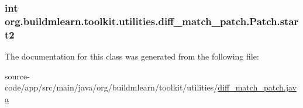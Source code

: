 \subsubsection[{\texorpdfstring{start2}{start2}}]{\setlength{\rightskip}{0pt plus 5cm}int org.\+buildmlearn.\+toolkit.\+utilities.\+diff\+\_\+match\+\_\+patch.\+Patch.\+start2}\hypertarget{classorg_1_1buildmlearn_1_1toolkit_1_1utilities_1_1diff__match__patch_1_1Patch_ad4d4afed8964a4aca079e5ca70aa85b5}{}\label{classorg_1_1buildmlearn_1_1toolkit_1_1utilities_1_1diff__match__patch_1_1Patch_ad4d4afed8964a4aca079e5ca70aa85b5}


The documentation for this class was generated from the following file\+:\begin{DoxyCompactItemize}
\item 
source-\/code/app/src/main/java/org/buildmlearn/toolkit/utilities/\hyperlink{diff__match__patch_8java}{diff\+\_\+match\+\_\+patch.\+java}\end{DoxyCompactItemize}
